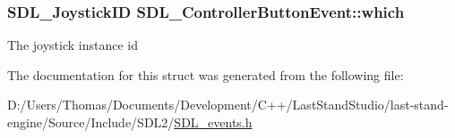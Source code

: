 \subsubsection[{which}]{\setlength{\rightskip}{0pt plus 5cm}S\+D\+L\+\_\+\+Joystick\+I\+D S\+D\+L\+\_\+\+Controller\+Button\+Event\+::which}\label{structSDL__ControllerButtonEvent_a98777e88b5d5cae83eef16ffd4bcacc1}
The joystick instance id 

The documentation for this struct was generated from the following file\+:\begin{DoxyCompactItemize}
\item 
D\+:/\+Users/\+Thomas/\+Documents/\+Development/\+C++/\+Last\+Stand\+Studio/last-\/stand-\/engine/\+Source/\+Include/\+S\+D\+L2/\hyperlink{SDL__events_8h}{S\+D\+L\+\_\+events.\+h}\end{DoxyCompactItemize}
